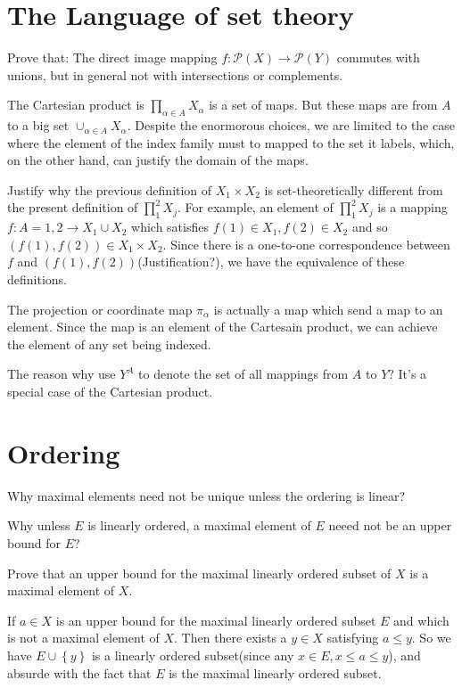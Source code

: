 \section{The Language of set theory}

Prove that: The direct image mapping $f:\mathcal{P}(X)\longrightarrow \mathcal{P}(Y)$ commutes with unions, but in general not with intersections or complements.

The Cartesian product is $\prod_{\alpha\in A}X_{\alpha}$ is a set of maps. But these maps are from $A$ to a big set $\cup_{\alpha\in A}X_{\alpha}$. Despite the enormorous choices, we are limited to the case where the element of the index family must to mapped to the set it labels, which, on the other hand, can justify the domain of the maps.

Justify why the previous definition of $X_1\times X_2$ is set-theoretically different from the present definition of $\prod_{1}^{2}X_j$. For example, an element of $\prod_{1}^{2}X_j$ is a mapping $f:A={1,2}\longrightarrow X_1\cup X_2$ which satisfies $f(1)\in X_1,f(2)\in X_2$ and so $(f(1),f(2))\in X_1\times X_2$. Since there is a one-to-one correspondence between $f$ and $(f(1),f(2))$(Justification?), we have the equivalence of these definitions.

The projection or coordinate map $\pi_{\alpha}$ is actually a map which send a map to an element. Since the map is an element of the Cartesain product, we can achieve the element of any set being indexed.

The reason why use $Y^A$ to denote the set of all mappings from $A$ to $Y$? It's a special case of the Cartesian product. 

\section{Ordering}
Why maximal elements need not be unique unless the ordering is linear?

Why unless $E$ is linearly ordered, a maximal element of $E$ neeed not be an upper bound for $E$?

Prove that an upper bound for the maximal linearly ordered subset of $X$ is a maximal element of $X$.

\noindent If $a\in X$ is an upper bound for the maximal linearly ordered subset $E$ and which is not a maximal element of $X$. Then there exists a $y\in X$ satisfying $a\le y$. So we have $E\cup \left\{y\right\}$ is a linearly ordered subset(since any $x\in E,x\le a\le y$), and absurde with the fact that $E$ is the maximal linearly ordered subset.

